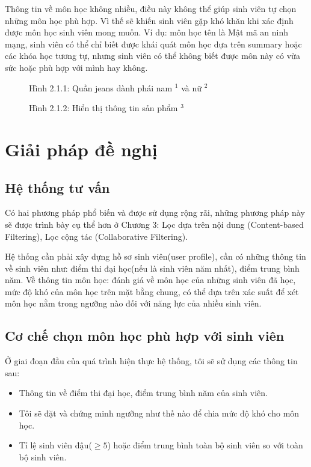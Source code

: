 \documentclass[a4paper,12pt,numbered,print,index,custombib, oneside, custommargin]{report}
\begin{document}
Thông tin về môn học không nhiều, điều này không thể giúp sinh viên tự chọn những môn học phù hợp. Vì thế sẽ khiến sinh viên gặp khó khăn khi xác định được môn học sinh viên mong muốn. Ví dụ: môn học tên là Mật mã an ninh mạng, sinh viên có thể chỉ biết được khái quát môn học dựa trên summary hoặc các khóa học tương tự, nhưng sinh viên có thể không biết được môn này có vừa sức hoặc phù hợp với mình hay không.
\begin{figure}[h]
\centering
\caption{Hình 2.1.1: Quần jeans dành phái nam $^1$ và nữ $^2$}
\end{figure}

\begin{figure}[h]
\centering
\caption{Hình 2.1.2: Hiển thị thông tin sản phẩm $^3$}
\end{figure}
\pagebreak


\section{Giải pháp đề nghị}
\subsection{Hệ thống tư vấn}
Có hai phương pháp phổ biến và được sử dụng rộng rãi, những phương pháp này sẽ được trình bày cụ thể hơn ở Chương 3: Lọc dựa trên nội dung (Content-based Filtering), Lọc cộng tác (Collaborative Filtering).

Hệ thống cần phải xây dựng hồ sơ sinh viên(user profile), cần có những thông tin về sinh viên như: điểm thi đại học(nếu là sinh viên năm nhất), điểm trung bình năm. Về thông tin môn học: đánh giá về môn học của những sinh viên đã học, mức độ khó của môn học trên mặt bằng chung, có thể dựa trên xác suất để xét môn học nằm trong ngưỡng nào đối với năng lực của nhiều sinh viên. 

\subsection{Cơ chế chọn môn học phù hợp với sinh viên}
Ở giai đoạn đầu của quá trình hiện thực hệ thống, tôi sẽ sử dụng các thông tin sau: 
\begin{itemize}
\item Thông tin về điểm thi đại học, điểm trung bình năm của sinh viên.
\item Tôi sẽ đặt và chứng minh ngưỡng như thế nào để chia mức độ khó cho môn học.
\item Tỉ lệ sinh viên đậu($\geq5$) hoặc điểm trung bình toàn bộ sinh viên so với toàn bộ sinh viên.
\end{itemize}
\end{document}
